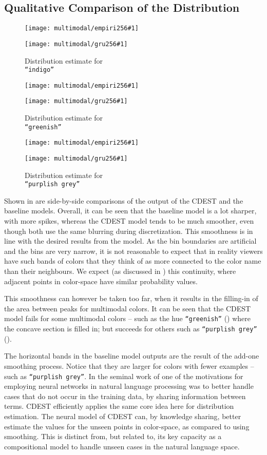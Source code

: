 \documentclass[11pt,a4paper]{article}
\newcommand{\textcite}{\cite}
\begin{document}
\subsection{Qualitative Comparison of the Distribution}\label{resultsdistributions}

\newcommand{\multimodalfig}[2]{
	\begin{figure}
		\texttt{[image: multimodal/empiri256\#1]}
		
		\vspace{3mm}
		
		\texttt{[image: multimodal/gru256\#1]}	
		\caption{\label{fig#1} Distribution estimate for \\ \mbox{\texttt{``#2''}}}
	\end{figure}
}

\multimodalfig{indigo}{indigo}
\multimodalfig{greenish}{greenish}
\multimodalfig{purplishgrey}{purplish grey}


Shown in  are side-by-side comparisons of the output of the CDEST and the baseline models.
Overall, it can be seen that the baseline model is a lot sharper, with more spikes,
whereas the CDEST model tends to be much smoother, even though both use the same blurring during discretization.
This smoothness is in line with the desired results from the model.
As the bin boundaries are artificial and the bins are very narrow, it is not reasonable to expect that in reality viewers have such bands of colors that they think of as more connected to the color name than their neighbours.
We expect  (as discussed in ) this continuity, where adjacent points in color-space have similar probability values.

This smoothness can however be taken too far, when it results in the filling-in of the area between peaks for multimodal colors.
It can be seen that the CDEST model fails for some multimodal colors -- such as the hue \texttt{``greenish''} () where the concave section is filled in;
but succeeds for others such as \texttt{``purplish grey''} ().


The horizontal bands in the baseline model outputs are the result of the add-one smoothing process.
Notice that they are larger for colors with fewer examples -- such as \texttt{``purplish grey''}.
In the seminal work of \textcite{NPLM} one of the motivations for employing neural networks in natural language processing was to better handle cases that do not occur in the training data, by sharing information between terms.
CDEST efficiently applies the same core idea here for distribution estimation.
The neural model of CDEST can, by knowledge sharing, better estimate the values for the unseen points in color-space, as compared to using smoothing.
This is distinct from, but related to, its key capacity as a compositional model to handle unseen cases in the natural language space. 
\end{document}
